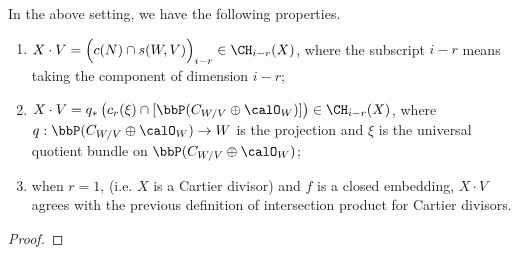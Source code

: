   \begin{proposition}
    In the above setting, we have the following properties.
    \begin{enumerate}
      \item $X \cdot V = \Big( c(N) \cap s(W,V) \Big)_{i-r} \in \CH_{i-r}(X)$, where the subscript $i-r$ means taking the component of dimension $i-r$;
      \item $X \cdot V = q_* \left( c_r(\xi) \cap [\bbP(C_{W/V} \oplus \calO_W)] \right) \in \CH_{i-r}(X)$, where $q: \bbP(C_{W/V} \oplus \calO_W) \to W$ is the projection and $\xi$ is the universal quotient bundle on $\bbP(C_{W/V} \oplus \calO_W)$;
      \item when $r=1$, (i.e. $X$ is a Cartier divisor) and $f$ is a closed embedding, $X \cdot V$ agrees with the previous definition of intersection product for Cartier divisors.
    \end{enumerate}
  \end{proposition}
  \begin{proof}
    \Yang{}
  \end{proof}